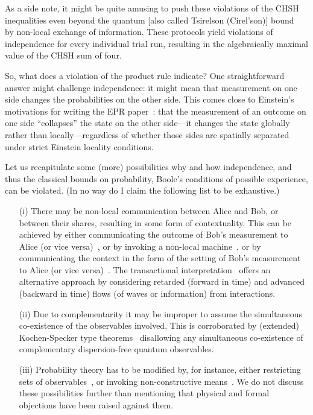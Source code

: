 \documentclass[entropy,article,accept,oneauthor,pdftex]{Definitions/mdpi}
\begin{document}
As a side note, it might be quite amusing to push these violations of the CHSH inequalities
even beyond the quantum [also called Tsirelson (Cirel'son)] bound~\cite{pop-rohr,svozil-krenn,svozil-2004-brainteaser,popescu-2014}
by non-local exchange of information. These protocols yield violations of independence for every individual trial run, resulting in
the algebraically maximal value of the CHSH sum of four.

So, what does a violation of the product rule indicate? One straightforward answer might challenge independence:
it might mean that measurement on one side changes the probabilities on the other side.
This comes close to Einstein's motivations for writing the EPR paper~\cite{einstei-letter-to-schr,Howard1985171,Howard1990}: that
the measurement of an outcome on one side ``collapses'' the state
on the other side---it changes the state globally rather than locally---regardless of whether those sides are spatially separated under strict Einstein locality conditions.


Let us recapitulate some (more) possibilities why and how independence, and thus the classical bounds on probability,
Boole's conditions of possible experience, can be violated.
(In no way do I claim the following list to be exhaustive.)
\begin{itemize}
\item[(i)] There may be non-local communication between Alice and Bob, or between their shares, resulting in some form of contextuality.
This can be achieved by either communicating the outcome of Bob's measurement to Alice
(or vice versa)~\cite{toner-bacon-03,svozil-2004-brainteaser},
or by invoking a non-local machine~\cite{cerf-gisin-massar-pop-04},
or by communicating the context in the form of the setting of Bob's measurement to Alice
(or vice versa)~\cite{svozil-2022-epr}.
The transactional interpretation~\cite{Cramer-RevModPhys.58.647} offers an alternative approach
by considering retarded (forward in time) and advanced (backward in time) flows (of waves or information) from interactions.
\item[(ii)] Due to complementarity it may be improper to assume the simultaneous co-existence of the observables involved.
This is corroborated by (extended) Kochen-Specker type theorems~\cite{specker-60,ZirlSchl-65,kochen2,pitowsky:218,hru-pit-2003,2015-AnalyticKS} disallowing
any simultaneous co-existence of complementary dispersion-free quantum observables.
\item[(iii)] Probability theory has to be modified by, for instance, either restricting sets of observables~\cite{meyer:99},
or invoking non-constructive means~\cite{pitowsky-83}. We do not discuss these possibilities further than mentioning that physical
and formal objections have been raised against them.
\end{itemize}
\end{document}
